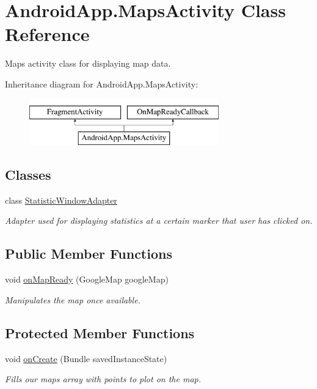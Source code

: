 \hypertarget{class_android_app_1_1_maps_activity}{}\section{Android\+App.\+Maps\+Activity Class Reference}
\label{class_android_app_1_1_maps_activity}


Maps activity class for displaying map data.  


Inheritance diagram for Android\+App.\+Maps\+Activity\+:\begin{figure}[H]
\begin{center}
\leavevmode
\includegraphics[height=2.000000cm]{class_android_app_1_1_maps_activity}
\end{center}
\end{figure}
\subsection*{Classes}
\begin{DoxyCompactItemize}
\item 
class \hyperlink{class_android_app_1_1_maps_activity_1_1_statistic_window_adapter}{Statistic\+Window\+Adapter}
\begin{DoxyCompactList}\small\item\em Adapter used for displaying statistics at a certain marker that user has clicked on. \end{DoxyCompactList}\end{DoxyCompactItemize}
\subsection*{Public Member Functions}
\begin{DoxyCompactItemize}
\item 
void \hyperlink{class_android_app_1_1_maps_activity_abee115dd67628da8e1140430428ce112}{on\+Map\+Ready} (Google\+Map google\+Map)
\begin{DoxyCompactList}\small\item\em Manipulates the map once available. \end{DoxyCompactList}\end{DoxyCompactItemize}
\subsection*{Protected Member Functions}
\begin{DoxyCompactItemize}
\item 
void \hyperlink{class_android_app_1_1_maps_activity_a179ec8e25e279c4fa33aa74a90019489}{on\+Create} (Bundle saved\+Instance\+State)
\begin{DoxyCompactList}\small\item\em Fills our maps array with points to plot on the map. \end{DoxyCompactList}\end{DoxyCompactItemize}
